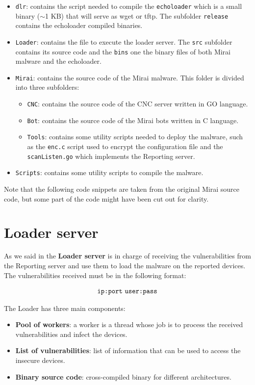 \begin{itemize}
    \item \texttt{dlr}: contains the script needed to compile the \texttt{echoloader} which is a small binary ($\sim$1 KB) that will serve as wget or tftp. The subfolder \texttt{release} contains the echoloader compiled binaries.
    \item \texttt{Loader}: contains the file to execute the loader server. The \texttt{src} subfolder contains its source code and the \texttt{bins} one the binary files of both Mirai malware and the echoloader. 
    \item \texttt{Mirai}: contains the source code of the Mirai malware. This folder is divided into three subfolders:
    \begin{itemize}
        \item \texttt{CNC}: contains the source code of the CNC server written in GO language. 
        \item \texttt{Bot}: contains the source code of the Mirai bots written in C language.
        \item \texttt{Tools}: contains some utility scripts needed to deploy the malware, such as the \texttt{enc.c} script used to encrypt the configuration file and the \texttt{scanListen.go} which implements the Reporting server.
    \end{itemize}
    \item \texttt{Scripts}: contains some utility scripts to compile the malware.
\end{itemize}

Note that the following code snippets are taken from the original Mirai source code, but some part of the code might have been cut out for clarity.

\section{Loader server}

As we said in  the \textbf{Loader server} is in charge of receiving the vulnerabilities from the Reporting server and use them to load the malware on the reported devices. The vulnerabilities received must be in the following format:

\[ \text{\texttt{ip:port} \texttt{user:pass}} \]

The Loader has three main components:
\begin{itemize}
    \item \textbf{Pool of workers}: a worker is a thread whose job is to process the received vulnerabilities and infect the devices. 
    \item \textbf{List of vulnerabilities}: list of information that can be used to access the insecure devices. 
    \item \textbf{Binary source code}: cross-compiled binary for different architectures. 
\end{itemize}

